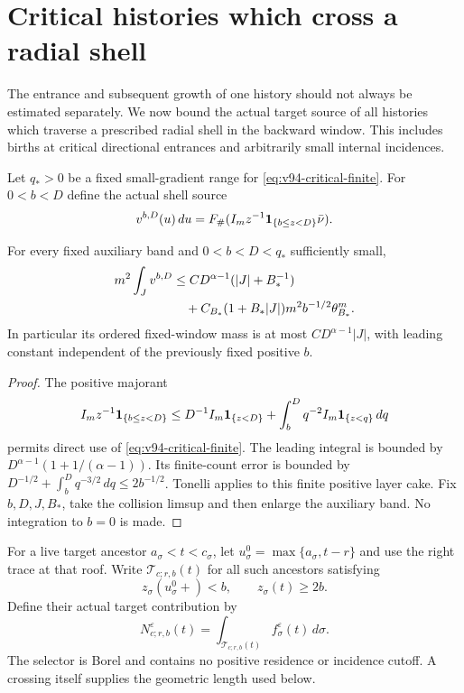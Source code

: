 \section{Critical histories which cross a radial shell}
\label{sec:v94-radial}
The entrance and subsequent growth of one history should not always
be estimated separately. We now bound the actual target source of
all histories which traverse a prescribed radial shell in the backward
window. This includes births at critical directional entrances and
arbitrarily small internal incidences.

Let $q_*>0$ be a fixed small-gradient range for
\eqref{eq:v94-critical-finite}. For $0<b<D$ define the actual shell source
\[
 v^{b,D}(u)\,du=F_\#(I_m z^{-1}\mathbf1_{\{b\le z<D\}}\bar\nu).
\]
\begin{lemma}
\label{lem:v94-shell-source}
For every fixed auxiliary band and $0<b<D<q_*$ sufficiently small,
\begin{align}
 m^2\int_Jv^{b,D}
 &\le C D^{\alpha-1}(|J|+B_*^{-1})\notag\\
 &\quad+C_{B_*}(1+B_*|J|)m^2 b^{-1/2}\theta_{B_*}^m.
                                             \label{eq:v94-shell-finite}
\end{align}
In particular its ordered fixed-window mass is at most
$C D^{\alpha-1}|J|$, with leading constant independent of the
previously fixed positive $b$.
\end{lemma}
\begin{proof}
The positive majorant
\[
 I_m z^{-1}\mathbf1_{\{b\le z<D\}}
 \le D^{-1}I_m\mathbf1_{\{z<D\}}
                  +\int_b^D q^{-2}I_m\mathbf1_{\{z<q\}}\,dq
\]
permits direct use of \eqref{eq:v94-critical-finite}. The leading
integral is bounded by
$D^{\alpha-1}(1+1/(\alpha-1))$. Its finite-count error is bounded
by $D^{-1/2}+\int_b^D q^{-3/2}\,dq\le2b^{-1/2}$.
Tonelli applies to this finite positive layer cake. Fix $b,D,J,B_*$,
take the collision limsup and then enlarge the auxiliary band.
No integration to $b=0$ is made.
\end{proof}

For a live target ancestor $a_\sigma<t<c_\sigma$, let
$u_\sigma^0=\max\{a_\sigma,t-r\}$ and use the right trace at that
roof. Write $\mathcal T_{c;r,b}(t)$ for all such ancestors satisfying
\begin{equation}\label{eq:v94-transit-selector}
             z_\sigma(u_\sigma^0+)<b,
                     \qquad z_\sigma(t)\ge2b.
\end{equation}
Define their actual target contribution by
\[
 N_{c;r,b}^\varepsilon(t)
       =\int_{\mathcal T_{c;r,b}(t)}f_\sigma^\varepsilon(t)\,d\sigma.
\]
The selector is Borel and contains no positive residence or incidence
cutoff. A crossing itself supplies the geometric length used below.

